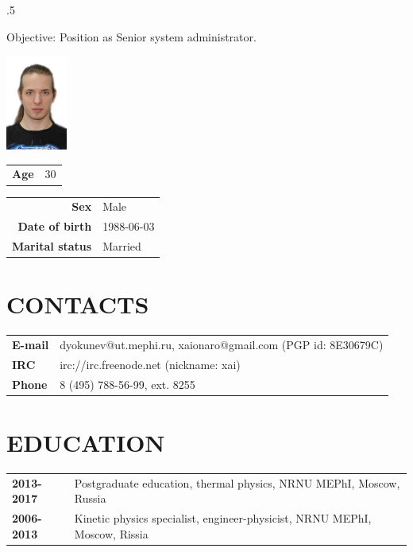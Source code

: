 \address{115522, 2 Moskvorechie Street (building 1), Moscow, Russia}


\begin{resume}
\vspace{0.1in}
\moveleft.5\sectionwidth\centerline{Objective: Position as Senior system administrator.}  

\vspace{-6.5em}
\flushright
\includegraphics[width=20mm]{photo.jpg}\\
\begin{tabular}{ll}
 {\bf Age} & 30\\
\end{tabular}
\flushleft

\vspace{-5.5em}
\begin{tabular}{rl}
 {\bf Sex}            & Male\\
 {\bf Date of birth}  & 1988-06-03\\
 {\bf Marital status} & Married\\
\end{tabular}

\section{CONTACTS}
\vspace{0.1in} 
\begin{tabular}{ll}
 {\bf E-mail} & dyokunev@ut.mephi.ru, xaionaro@gmail.com (PGP id: 8E30679C)\\
 {\bf IRC}    & irc://irc.freenode.net (nickname: xai)\\
 {\bf Phone}  & 8 (495) 788-56-99, ext. 8255\\
\end{tabular}

\section{EDUCATION}
\vspace{0.1in} 
\begin{tabular}{ll}
 {\bf 2013-2017} & Postgraduate education, thermal physics, NRNU MEPhI, Moscow, Russia\\
 {\bf 2006-2013} & Kinetic physics specialist, engineer-physicist, NRNU MEPhI, Moscow, Rissia\\
\end{tabular}


\end{resume}
